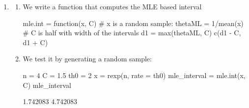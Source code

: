 \documentclass[12pt, a4paper]{article}\usepackage[]{graphicx}\usepackage[]{color}
\begin{document}


\pagestyle{default}
\thispagestyle{empty}

\newpage
\setcounter{page}{1}
\begin{enumerate}[label={\bfseries\arabic*}]
\item 

  \begin{enumerate}[label=(\alph*)]
  \item We write a function that computes the MLE based interval
\begin{Schunk}
\begin{Sinput}
mle.int = function(x, C) {
    # x is a random sample:
    thetaML = 1/mean(x)
    # C is half with width of the intervals
    d1 = max(thetaML, C)
    c(d1 - C, d1 + C)
}
\end{Sinput}
\end{Schunk}
  \item We test it by generating a random sample:
\begin{Schunk}
\begin{Sinput}
n = 4
C = 1.5
th0 = 2
x = rexp(n, rate = th0)
mle_interval = mle.int(x, C)
mle_interval
\end{Sinput}
\begin{Soutput}
[1] 1.742083 4.742083
\end{Soutput}
\end{Schunk}
  \end{enumerate}


\end{enumerate}
\end{document}
